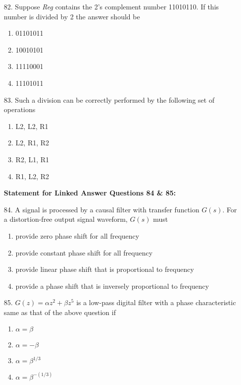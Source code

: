 \documentclass[journal,12pt,onecolumn]{IEEEtran}
\theoremstyle{remark}
\begin{document}
\begin{enumerate}
    \item [82.] Suppose \textit{Reg} contains the 2's complement number 11010110. If this number is divided by 2 the answer should be
    \begin{enumerate}
        \item 01101011
        \item 10010101
        \item 11110001
        \item 11101011
    \end{enumerate}
    \item [83.] Such a division can be correctly performed by the following set of operations
    \begin{enumerate}[label=(\Alph*)]
        \item L2, L2, R1
        \item L2, R1, R2
        \item R2, L1, R1
        \item R1, L2, R2
    \end{enumerate}


\textbf{Statement for Linked Answer Questions 84 \& 85:}


\item [84.] A signal is processed by a causal filter with transfer function $G(s)$. For a distortion-free output signal waveform, $G(s)$ must
    \begin{enumerate}
        \item provide zero phase shift for all frequency
        \item provide constant phase shift for all frequency
        \item provide linear phase shift that is proportional to frequency
        \item provide a phase shift that is inversely proportional to frequency
    \end{enumerate}

    \item [85.] $G(z) = \alpha z^2 + \beta z^5$ is a low-pass digital filter with a phase characteristic same as that of the above question if
    \begin{enumerate}
        \item $\alpha = \beta$
        \item $\alpha = -\beta$
        \item $\alpha = \beta^{1/3}$
        \item $\alpha = \beta^{-(1/3)}$
    \end{enumerate}

    
\end{enumerate}
\end{document}
